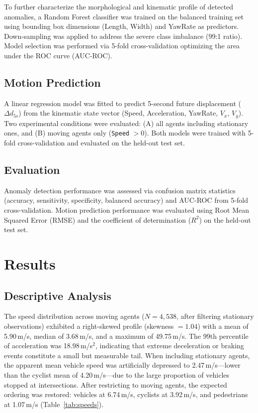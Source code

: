 \documentclass[conference]{IEEEtran}
\begin{document}
To further characterize the morphological and kinematic profile of detected anomalies, a Random Forest classifier was trained on the balanced training set using bounding box dimensions (Length, Width) and YawRate as predictors. Down-sampling was applied to address the severe class imbalance (99:1 ratio). Model selection was performed via 5-fold cross-validation optimizing the area under the ROC curve (AUC-ROC).

\subsection{Motion Prediction}

A linear regression model was fitted to predict 5-second future displacement ($\Delta d_{5s}$) from the kinematic state vector (Speed, Acceleration, YawRate, $V_x$, $V_y$). Two experimental conditions were evaluated: (A) all agents including stationary ones, and (B) moving agents only (\texttt{Speed} $> 0$). Both models were trained with 5-fold cross-validation and evaluated on the held-out test set.

\subsection{Evaluation}

Anomaly detection performance was assessed via confusion matrix statistics (accuracy, sensitivity, specificity, balanced accuracy) and AUC-ROC from 5-fold cross-validation. Motion prediction performance was evaluated using Root Mean Squared Error (RMSE) and the coefficient of determination ($R^2$) on the held-out test set.

\section{Results}

\subsection{Descriptive Analysis}

The speed distribution across moving agents ($N = 4{,}538$, after filtering stationary observations) exhibited a right-skewed profile (skewness $= 1.04$) with a mean of 5.90\,m/s, median of 3.68\,m/s, and a maximum of 49.75\,m/s. The 99th percentile of acceleration was 18.98\,m/s$^2$, indicating that extreme deceleration or braking events constitute a small but measurable tail. When including stationary agents, the apparent mean vehicle speed was artificially depressed to 2.47\,m/s---lower than the cyclist mean of 4.20\,m/s---due to the large proportion of vehicles stopped at intersections. After restricting to moving agents, the expected ordering was restored: vehicles at 6.74\,m/s, cyclists at 3.92\,m/s, and pedestrians at 1.07\,m/s (Table~\ref{tab:speeds}).
\end{document}
